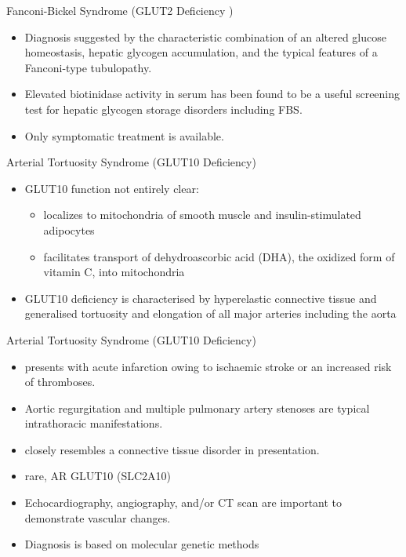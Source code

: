 \documentclass[presentation, smaller]{beamer}
\begin{document}
\begin{frame}[label={sec:org22bbb8c}]{Fanconi-Bickel Syndrome (GLUT2 Deficiency )}
\begin{itemize}
\item Diagnosis suggested by the characteristic combination of an altered
glucose homeostasis, hepatic glycogen accumulation, and the typical
features of a Fanconi-type tubulopathy.

\item Elevated biotinidase activity in serum has been found to be a useful
screening test for hepatic glycogen storage disorders including FBS.

\item Only symptomatic treatment is available.
\end{itemize}
\end{frame}

\begin{frame}[label={sec:org141d8e0}]{Arterial Tortuosity Syndrome (GLUT10 Deficiency)}
\begin{itemize}
\item GLUT10 function not entirely clear:
\begin{itemize}
\item localizes to mitochondria of smooth muscle and insulin-stimulated adipocytes
\item facilitates transport of dehydroascorbic acid (DHA), the
oxidized form of vitamin C, into mitochondria
\end{itemize}

\item GLUT10 deficiency is characterised by hyperelastic connective tissue
and generalised tortuosity and elongation of all major arteries
including the aorta
\end{itemize}
\end{frame}

\begin{frame}[label={sec:orgf5adafb}]{Arterial Tortuosity Syndrome (GLUT10 Deficiency)}
\begin{itemize}
\item presents with acute infarction owing to ischaemic stroke or an
increased risk of thromboses.
\item Aortic regurgitation and multiple pulmonary artery stenoses are
typical intrathoracic manifestations.
\item closely resembles a connective tissue disorder in presentation.

\item rare, AR GLUT10 (SLC2A10)
\item Echocardiography, angiography, and/or CT scan are important to demonstrate vascular changes.
\item Diagnosis is based on molecular genetic methods
\end{itemize}
\end{frame}
\end{document}
